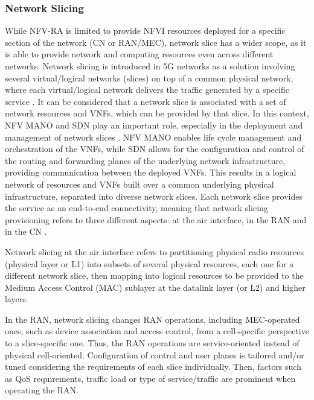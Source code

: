 \subsubsection{Network Slicing}

While NFV-RA is limited to provide NFVI resources deployed for a specific section of the network (CN or RAN/MEC), network slice has a wider scope, as it is able to provide network and computing resources even across different networks. Network slicing \cite{Foukas2017, Afolabi2018} is introduced in 5G networks as a solution involving several virtual/logical networks (slices) on top of a common physical network, where each virtual/logical network delivers the traffic generated by a specific service \cite{Nakao2017, Rost2017}. It can be considered that a network slice is associated with a set of network resources and VNFs, which can be provided by that slice. In this context, NFV MANO and SDN play an important role, especially in the deployment and management of network slices \cite{Ordonez2017, Zhang2019-2}. NFV MANO enables life cycle management and orchestration of the VNFs, while SDN allows for the configuration and control of the routing and forwarding planes of the underlying network infrastructure, providing communication between the deployed VNFs. This results in a logical network of resources and VNFs built over a common underlying physical infrastructure, 
separated into diverse network slices. Each network slice provides the service as an end-to-end connectivity, meaning that network slicing provisioning refers to three different aspects: at the air interface, in the RAN and in the CN \cite{Kotulski2017, Li2016}.

Network slicing at the air interface refers to partitioning physical radio resources (physical layer or L1) into subsets of several physical resources, each one for a different network slice, then mapping into logical resources to be provided to the Medium Access Control (MAC) sublayer at the datalink layer (or L2) and higher layers.

In the RAN, network slicing changes RAN operations, including MEC-operated ones, such as device association and access control, from a cell-specific perspective to a slice-specific one. Thus, the RAN operations are service-oriented instead of physical cell-oriented. Configuration of control and user planes is tailored and/or tuned considering the requirements of each slice individually. Then, factors such as QoS requirements, traffic load or type of service/traffic are prominent when operating the RAN.

